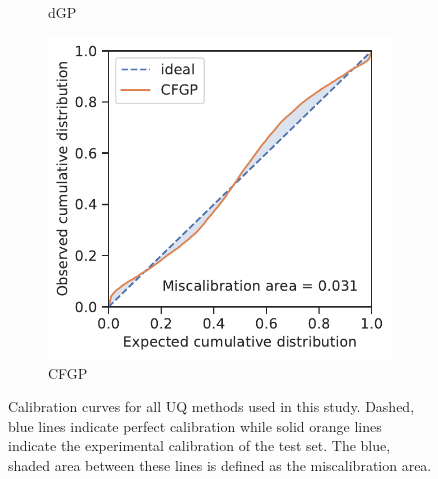 \documentclass[]{achemso}
\begin{document}
\begin{figure}
\begin{subfigure}{0.32\textwidth}
        \caption{\gls{dGP}}\label{fig:calibration_dgp}
    \end{subfigure}
    \begin{subfigure}{0.32\textwidth}
        \includegraphics[width=\textwidth]{../CFGP/Matern/calibration.pdf}
        \caption{\gls{CFGP}}\label{fig:calibration_cfgp}
    \end{subfigure}
    \caption{Calibration curves for all \gls{UQ} methods used in this study.
    Dashed, blue lines indicate perfect calibration while solid orange lines indicate the experimental calibration of the test set.
    The blue, shaded area between these lines is defined as the miscalibration area.
    }\label{fig:calibration}
\end{figure}
\end{document}
